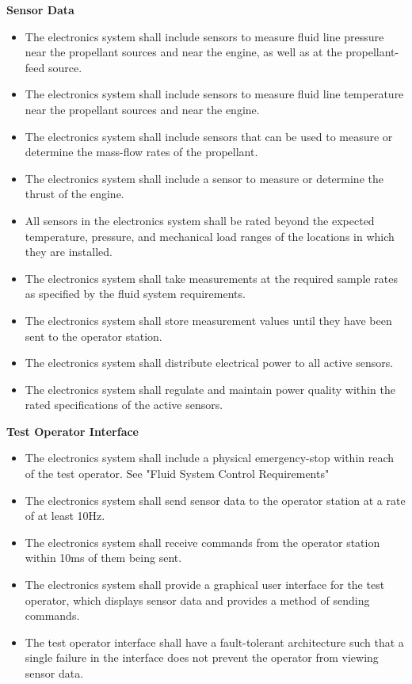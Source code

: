 \textbf{Sensor Data}
    \begin{itemize}
        \item The electronics system shall include sensors to measure fluid line pressure near the propellant sources and near the engine, as well as at the propellant-feed source.
        \item The electronics system shall include sensors to measure fluid line temperature near the propellant sources and near the engine.
        \item The electronics system shall include sensors that can be used to measure or determine the mass-flow rates of the propellant.
        \item The electronics system shall include a sensor to measure or determine the thrust of the engine.
        \item All sensors in the electronics system shall be rated beyond the expected temperature, pressure, and mechanical load ranges of the locations in which they are installed.
        \item The electronics system shall take measurements at the required sample rates as specified by the fluid system requirements.
        \item The electronics system shall store measurement values until they have been sent to the operator station.
        \item The electronics system shall distribute electrical power to all active sensors.
        \item The electronics system shall regulate and maintain power quality within the rated specifications of the active sensors.
    \end{itemize}

\textbf{Test Operator Interface}
    \begin{itemize}
        \item The electronics system shall include a physical emergency-stop within reach of the test operator. See "Fluid System Control Requirements"
        \item The electronics system shall send sensor data to the operator station at a rate of at least 10Hz.
        \item The electronics system shall receive commands from the operator station within 10ms of them being sent.
        \item The electronics system shall provide a graphical user interface for the test operator, which displays sensor data and provides a method of sending commands.
        \item The test operator interface shall have a fault-tolerant architecture such that a single failure in the interface does not prevent the operator from viewing sensor data.
    \end{itemize}


